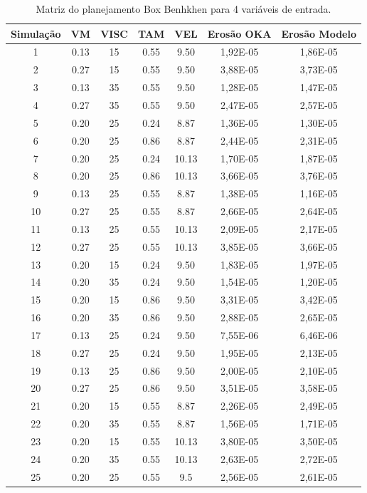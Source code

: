 \begin{table}[H]
\caption{Matriz do planejamento Box Benhkhen para 4 variáveis de entrada.}
\begin{tabular*}{\textwidth}{@{\extracolsep{\stretch{1}}}*{7}{c}@{}}
 \toprule
   Simulação &VM	&VISC	&TAM	&VEL&Erosão OKA&Erosão Modelo	\\
  \midrule

1  & 0.13 & 15 & 0.55  & 9.50  & 1,92E-05 & 1,86E-05 \\
2  & 0.27 & 15& 0.55  & 9.50   & 3,88E-05 & 3,73E-05 \\
3  & 0.13 & 35& 0.55  & 9.50   & 1,28E-05 & 1,47E-05 \\
4  & 0.27 & 35 & 0.55  & 9.50  & 2,47E-05 & 2,57E-05 \\
5  & 0.20  & 25  & 0.24 & 8.87  & 1,36E-05 & 1,30E-05 \\
6  & 0.20  & 25  & 0.86 & 8.87  & 2,44E-05 & 2,31E-05 \\
7  & 0.20  & 25  & 0.24 & 10.13 & 1,70E-05 & 1,87E-05 \\
8  & 0.20  & 25  & 0.86 & 10.13 & 3,66E-05  & 3,76E-05 \\
9  & 0.13 & 25  & 0.55  & 8.87  & 1,38E-05 & 1,16E-05 \\
10 & 0.27 & 25  & 0.55  & 8.87  & 2,66E-05 & 2,64E-05 \\
11 & 0.13 & 25  & 0.55  & 10.13 & 2,09E-05 & 2,17E-05 \\
12 & 0.27 & 25  & 0.55  & 10.13 & 3,85E-05 & 3,66E-05 \\
13 & 0.20  & 15 & 0.24 & 9.50   & 1,83E-05 & 1,97E-05 \\
14 & 0.20  & 35 & 0.24 & 9.50   & 1,54E-05 & 1,20E-05 \\
15 & 0.20  & 15 & 0.86 & 9.50   & 3,31E-05 & 3,42E-05 \\
16 & 0.20  & 35 & 0.86 & 9.50   & 2,88E-05 & 2,65E-05 \\
17 & 0.13 & 25 & 0.24& 9.50  & 7,55E-06 & 6,46E-06 \\
18 & 0.27 & 25  & 0.24 & 9.50   & 1,95E-05 & 2,13E-05 \\
19 & 0.13 & 25  & 0.86 & 9.50   & 2,00E-05 & 2,10E-05 \\
20 & 0.27 & 25  & 0.86 & 9.50   & 3,51E-05 & 3,58E-05 \\
21 & 0.20  & 15 & 0.55  & 8.87  & 2,26E-05 & 2,49E-05 \\
22 & 0.20  & 35 & 0.55  & 8.87   & 1,56E-05 & 1,71E-05 \\
23 & 0.20  & 15 & 0.55  & 10.13 & 3,80E-05 & 3,50E-05 \\
24 & 0.20  & 35 & 0.55  & 10.13 & 2,63E-05 & 2,72E-05 \\
25 & 0.20  & 25  & 0.55  & 9.5    & 2,56E-05 & 2,61E-05\\

\bottomrule 
\end{tabular*}
\label{tab:box555}
\end{table}


